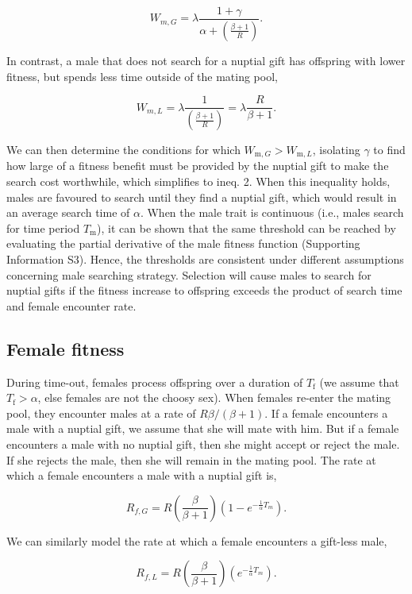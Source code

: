 \documentclass[
]{article}
\begin{document}
\[W_{m,G} = \lambda \frac{1 + \gamma}{\alpha + \left( \frac{\beta + 1}{R} \right)}.\]

In contrast, a male that does not search for a nuptial gift has
offspring with lower fitness, but spends less time outside of the mating
pool,

\[W_{m,L} = \lambda \frac{1}{\left(\frac{\beta+1}{R} \right)} = \lambda \frac{R}{\beta + 1}.\]

We can then determine the conditions for which
\(W_{\mathrm{m},G} > W_{\mathrm{m},L}\), isolating \(\gamma\) to find
how large of a fitness benefit must be provided by the nuptial gift to
make the search cost worthwhile, which simplifies to ineq. 2. When this
inequality holds, males are favoured to search until they find a nuptial
gift, which would result in an average search time of \(\alpha\). When
the male trait is continuous (i.e., males search for time period
\(T_{\mathrm{m}}\)), it can be shown that the same threshold can be
reached by evaluating the partial derivative of the male fitness
function (Supporting Information S3). Hence, the thresholds are
consistent under different assumptions concerning male searching
strategy. Selection will cause males to search for nuptial gifts if the
fitness increase to offspring exceeds the product of search time and
female encounter rate.

\hypertarget{female-fitness}{%
\subsection{Female fitness}\label{female-fitness}}

During time-out, females process offspring over a duration of
\(T_{\mathrm{f}}\) (we assume that \(T_{\mathrm{f}} > \alpha\), else
females are not the choosy sex). When females re-enter the mating pool,
they encounter males at a rate of \(R\beta/(\beta + 1)\). If a female
encounters a male with a nuptial gift, we assume that she will mate with
him. But if a female encounters a male with no nuptial gift, then she
might accept or reject the male. If she rejects the male, then she will
remain in the mating pool. The rate at which a female encounters a male
with a nuptial gift is,

\[R_{f,G} = R \left(\frac{\beta}{\beta + 1}\right)\left(1 - e^{-\frac{1}{\alpha}T_{m}}\right).\]

We can similarly model the rate at which a female encounters a gift-less
male,

\[R_{f,L} = R \left(\frac{\beta}{\beta + 1}\right)\left(e^{-\frac{1}{\alpha}T_{m}}\right).\]
\end{document}
